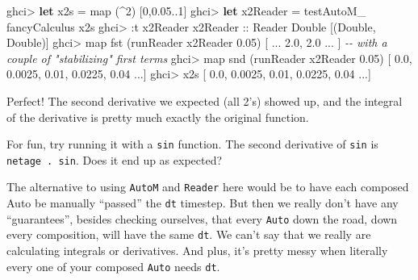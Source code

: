 \documentclass[]{article}
\newenvironment{Shaded}{}{}
\newcommand{\CommentTok}[1]{\textcolor[rgb]{0.38,0.63,0.69}{\textit{#1}}}
\newcommand{\DataTypeTok}[1]{\textcolor[rgb]{0.56,0.13,0.00}{#1}}
\newcommand{\DecValTok}[1]{\textcolor[rgb]{0.25,0.63,0.44}{#1}}
\newcommand{\FloatTok}[1]{\textcolor[rgb]{0.25,0.63,0.44}{#1}}
\newcommand{\FunctionTok}[1]{\textcolor[rgb]{0.02,0.16,0.49}{#1}}
\newcommand{\KeywordTok}[1]{\textcolor[rgb]{0.00,0.44,0.13}{\textbf{#1}}}
\newcommand{\NormalTok}[1]{#1}
\newcommand{\OperatorTok}[1]{\textcolor[rgb]{0.40,0.40,0.40}{#1}}
\newcommand{\OtherTok}[1]{\textcolor[rgb]{0.00,0.44,0.13}{#1}}
\begin{document}
\begin{Shaded}
\begin{Highlighting}[]
\NormalTok{ghci}\OperatorTok{\textgreater{}} \KeywordTok{let}\NormalTok{ x2s }\OtherTok{=} \FunctionTok{map}\NormalTok{ (}\OperatorTok{\^{}}\DecValTok{2}\NormalTok{) [}\DecValTok{0}\NormalTok{,}\FloatTok{0.05}\OperatorTok{..}\DecValTok{1}\NormalTok{]}
\NormalTok{ghci}\OperatorTok{\textgreater{}} \KeywordTok{let}\NormalTok{ x2Reader }\OtherTok{=}\NormalTok{ testAutoM\_ fancyCalculus x2s}
\NormalTok{ghci}\OperatorTok{\textgreater{}} \OperatorTok{:}\NormalTok{t x2Reader}
\OtherTok{x2Reader ::} \DataTypeTok{Reader} \DataTypeTok{Double}\NormalTok{ [(}\DataTypeTok{Double}\NormalTok{, }\DataTypeTok{Double}\NormalTok{)]}
\NormalTok{ghci}\OperatorTok{\textgreater{}} \FunctionTok{map} \FunctionTok{fst}\NormalTok{ (runReader x2Reader }\FloatTok{0.05}\NormalTok{)}
\NormalTok{[ }\OperatorTok{...} \FloatTok{2.0}\NormalTok{, }\FloatTok{2.0} \OperatorTok{...}\NormalTok{ ]    }\CommentTok{{-}{-} with a couple of "stabilizing" first terms}
\NormalTok{ghci}\OperatorTok{\textgreater{}} \FunctionTok{map} \FunctionTok{snd}\NormalTok{ (runReader x2Reader }\FloatTok{0.05}\NormalTok{)}
\NormalTok{[ }\FloatTok{0.0}\NormalTok{, }\FloatTok{0.0025}\NormalTok{, }\FloatTok{0.01}\NormalTok{, }\FloatTok{0.0225}\NormalTok{, }\FloatTok{0.04} \OperatorTok{...}\NormalTok{]}
\NormalTok{ghci}\OperatorTok{\textgreater{}}\NormalTok{ x2s}
\NormalTok{[ }\FloatTok{0.0}\NormalTok{, }\FloatTok{0.0025}\NormalTok{, }\FloatTok{0.01}\NormalTok{, }\FloatTok{0.0225}\NormalTok{, }\FloatTok{0.04} \OperatorTok{...}\NormalTok{]}
\end{Highlighting}
\end{Shaded}

Perfect! The second derivative we expected (all 2's) showed up, and the integral
of the derivative is pretty much exactly the original function.

For fun, try running it with a \texttt{sin} function. The second derivative of
\texttt{sin} is \texttt{netage\ .\ sin}. Does it end up as expected?

The alternative to using \texttt{AutoM} and \texttt{Reader} here would be to
have each composed Auto be manually ``passed'' the \texttt{dt} timestep. But
then we really don't have any ``guarantees'', besides checking ourselves, that
every \texttt{Auto} down the road, down every composition, will have the same
\texttt{dt}. We can't say that we really are calculating integrals or
derivatives. And plus, it's pretty messy when literally every one of your
composed \texttt{Auto} needs \texttt{dt}.
\end{document}
